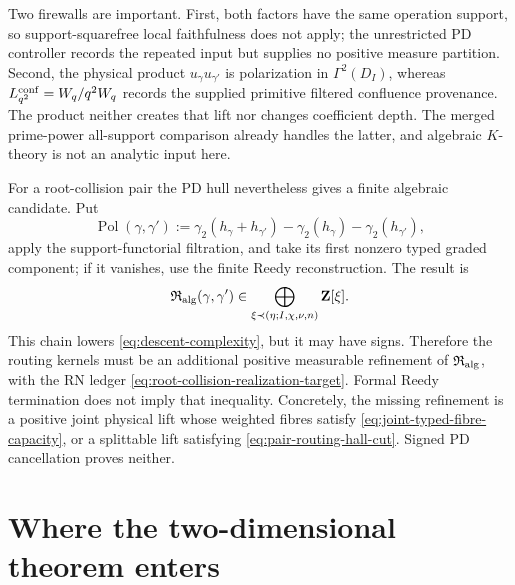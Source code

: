\documentclass[11pt]{article}
\begin{document}
Two firewalls are important.  First, both factors have the same operation
support, so support-squarefree local faithfulness does not apply; the
unrestricted PD controller records the repeated input but supplies no positive
measure partition.  Second, the physical product
\(u_\gamma u_{\gamma'}\) is polarization in \(\Gamma^2(D_I)\), whereas
\(L^{\rm conf}_{q^2}=W_q/q^2W_q\) records the supplied primitive filtered
confluence provenance.  The product neither creates that lift nor changes
coefficient depth.  The merged prime-power all-support comparison already
handles the latter, and algebraic \(K\)-theory is not an analytic input here.

For a root-collision pair the PD hull nevertheless gives a finite algebraic
candidate.  Put
\[
 \operatorname{Pol}(\gamma,\gamma')
 :=
 \gamma_2(h_\gamma+h_{\gamma'})
 -\gamma_2(h_\gamma)-\gamma_2(h_{\gamma'}),
\]
apply the support-functorial filtration, and take its first nonzero typed
graded component; if it vanishes, use the finite Reedy reconstruction.  The
result is
\begin{equation}\label{eq:algebraic-root-collision-routing}
 \mathfrak R_{\rm alg}(\gamma,\gamma')
 \in
 \bigoplus_{\xi\prec(\eta;I,\chi,\nu,n)}\mathbf Z[\xi].
\end{equation}
This chain lowers \eqref{eq:descent-complexity}, but it may have signs.
Therefore the routing kernels must be an additional positive measurable
refinement of \(\mathfrak R_{\rm alg}\), with the RN ledger
\eqref{eq:root-collision-realization-target}.  Formal Reedy termination does
not imply that inequality.  Concretely, the missing refinement is a positive
joint physical lift whose weighted fibres satisfy
\eqref{eq:joint-typed-fibre-capacity}, or a splittable lift satisfying
\eqref{eq:pair-routing-hall-cut}.  Signed PD cancellation proves neither.
\section{Where the two-dimensional theorem enters}
\end{document}
